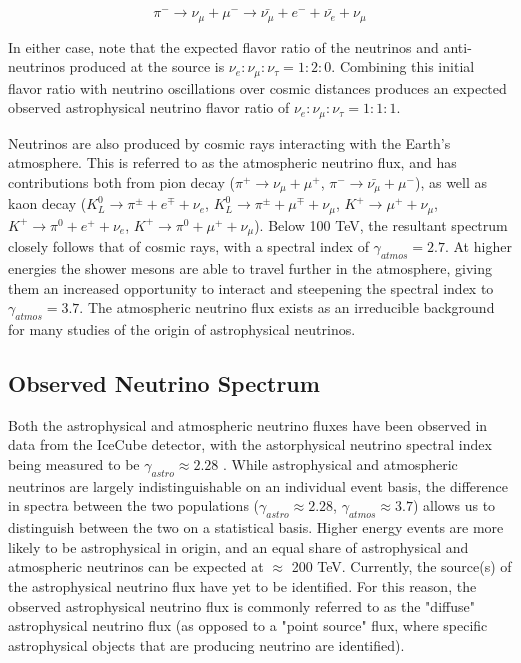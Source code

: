 \begin{equation}
    \pi^- \rightarrow \nu_{\mu} + \mu^- \rightarrow \bar{\nu_{\mu}} + e ^- + \bar{\nu_{e}}+\nu_{\mu}
\label{nuprodeq2}
\end{equation}

In either case, note that the expected flavor ratio of the neutrinos and anti-neutrinos produced at the source is $\nu_e : \nu_{\mu} : \nu_{\tau} = 1 : 2 : 0$. Combining this initial flavor ratio with neutrino oscillations over cosmic distances produces an expected observed astrophysical neutrino flavor ratio of $\nu_e : \nu_{\mu} : \nu_{\tau} = 1 : 1 : 1$.

Neutrinos are also produced by cosmic rays interacting with the Earth's atmosphere. This is referred to as the atmospheric neutrino flux, and has contributions both from pion decay ($\pi^+ \rightarrow \nu_{\mu} + \mu^+$, $\pi^- \rightarrow \bar{\nu_{\mu}} + \mu^-$), as well as kaon decay ($K^0_L \rightarrow \pi^\pm+ e^\mp +\nu_e$, $K^0_L \rightarrow \pi^\pm+ \mu^\mp +\nu_\mu$, $K^+ \rightarrow \mu^+ +\nu_\mu$, $K^+ \rightarrow \pi^0 + e^+ +\nu_e$, $K^+ \rightarrow \pi^0 + \mu^+ +\nu_\mu$). Below 100 TeV, the resultant spectrum closely follows that of cosmic rays, with a spectral index of $\gamma_{atmos}=2.7$. At higher energies the shower mesons are able to travel further in the atmosphere, giving them an increased opportunity to interact and steepening the spectral index to $\gamma_{atmos}=3.7$. The atmospheric neutrino flux exists as an irreducible background for many studies of the origin of astrophysical neutrinos. 

\subsection{Observed Neutrino Spectrum}
Both the astrophysical and atmospheric neutrino fluxes have been observed in data from the IceCube detector, with the astorphysical neutrino spectral index being measured to be $\gamma_{astro} \approx 2.28$ \cite{stettner2019measurement}.  While astrophysical and atmospheric neutrinos are largely indistinguishable on an individual event basis, the difference in spectra between the two populations ($\gamma_{astro} \approx 2.28$, $\gamma_{atmos} \approx 3.7$) allows us to distinguish between the two on a statistical basis. Higher energy events are more likely to be astrophysical in origin, and an equal share of astrophysical and atmospheric neutrinos can be expected at $\approx$ 200 TeV. Currently, the source(s) of the astrophysical neutrino flux have yet to be identified. For this reason, the observed astrophysical neutrino flux is commonly referred to as the "diffuse" astrophysical neutrino flux (as opposed to a "point source" flux, where specific astrophysical objects that are producing neutrino are identified).

